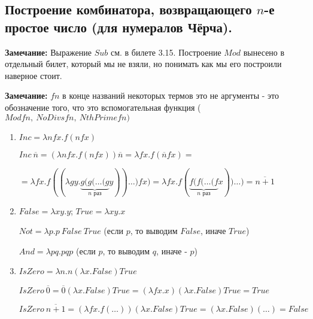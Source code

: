 \subsection{Построение комбинатора, возвращающего $n$-е простое число (для нумералов Чёрча).}
\par \textbf{Замечание:} Выражение $Sub$ см. в билете 3.15. Построение $Mod$ вынесено в отдельный билет, который мы не взяли, но понимать как мы его построили наверное стоит.
\par \textbf{Замечание:} $fn$ в конце названий некоторых термов это не аргументы - это обозначение того, что это вспомогательная функция ($Modfn, \: NoDivsfn, \: NthPrimefn)$
\begin{enumerate}
    \item $Inc=\lambda nfx.f(nfx)$
    \par $Inc \: \overline{n}=(\lambda nfx.f(nfx))\overline{n}=\lambda fx.f(\overline{n}fx)=$ \par $=\lambda fx.f((\lambda gy.\underbrace{g(g(\ldots(g}_{n \text{ раз}}y))\ldots)fx)=\lambda fx.f(\underbrace{f(f(\ldots(f}_{n \text{ раз}}x))\ldots)=\overline{n+1}$
    \item $False = \lambda xy.y$; $True = \lambda xy.x$
    \par $Not = \lambda p.p \: False \: True$ (если $p$, то выводим $False$, иначе $True$)
    \par $And=\lambda pq.pqp$ (если $p$, то выводим $q$, иначе - $p$)
    \item $IsZero=\lambda n.n(\lambda x.False)True$
    \par $IsZero \: \overline{0}=\overline{0}(\lambda x.False)True=(\lambda fx.x)(\lambda x.False)True=True$
    \par $IsZero \: \overline{n+1}=(\lambda fx.f(\ldots))(\lambda x.False)True=(\lambda x.False)(\ldots)=False$


\end{enumerate}
